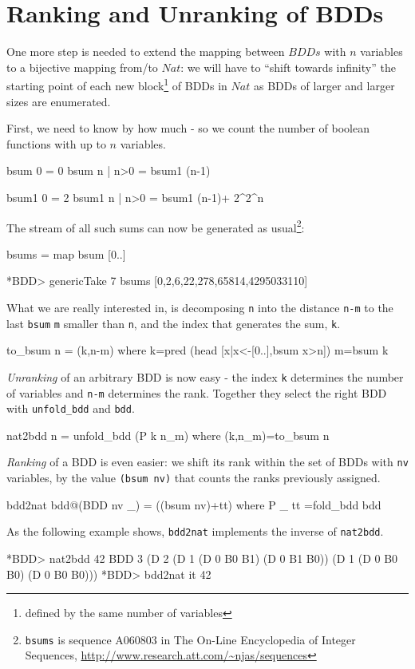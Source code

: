 \documentclass[]{INCLUDES/llncs}
\begin{document}
\section{Ranking and Unranking of BDDs} \label{rank}

One more step is needed to extend the mapping between $BDDs$ with $n$
variables to a bijective mapping from/to $Nat$: 
we will have to ``shift towards infinity'' 
the starting point of each new block\footnote{defined by the same number of
variables} of BDDs in $Nat$ as BDDs of larger and larger sizes are enumerated.

First, we need to know by how much - so we count the number
of boolean functions with up to $n$ variables.
\begin{code}
bsum 0 = 0
bsum n | n>0 = bsum1 (n-1)

bsum1 0 = 2
bsum1 n | n>0 = bsum1 (n-1)+ 2^2^n
\end{code}
The stream of all such sums can now be generated as usual\footnote{{\tt bsums}
is sequence A060803 in The On-Line Encyclopedia of Integer
Sequences, \url{http://www.research.att.com/~njas/sequences}}:
\begin{code}
bsums = map bsum [0..]
\end{code}
\begin{codex}
*BDD> genericTake 7 bsums
  [0,2,6,22,278,65814,4295033110]
\end{codex}

What we are really interested in, is decomposing {\tt n} into
the distance {\tt n-m} to the
last {\tt bsum} {\tt m} smaller than {\tt n},
and the index that generates the sum, {\tt k}.
\begin{code}
to_bsum n = (k,n-m) where 
  k=pred (head [x|x<-[0..],bsum x>n])
  m=bsum k
\end{code}
{\em Unranking} of an arbitrary BDD is now easy - the index {\tt k}
determines the number of variables and {\tt n-m} determines
the rank. Together they select the right BDD
with {\tt unfold\_bdd} and {\tt bdd}.
\begin{code}
nat2bdd n = unfold_bdd (P k n_m)
  where (k,n_m)=to_bsum n
\end{code}
{\em Ranking} of a BDD is even easier: we shift its rank
within the set of BDDs with {\tt nv} 
variables, by the value {\tt (bsum nv)} that
counts the ranks previously assigned.
\begin{code}
bdd2nat bdd@(BDD nv _) =  ((bsum nv)+tt) where
  P _ tt =fold_bdd bdd
\end{code}
As the following example shows,
{\tt bdd2nat}
implements the inverse of
{\tt nat2bdd}.
\begin{codex}
*BDD> nat2bdd 42
BDD 3 (D 2 (D 1 (D 0 B0 B1) (D 0 B1 B0)) 
           (D 1 (D 0 B0 B0) (D 0 B0 B0)))
*BDD> bdd2nat it
42
\end{codex}
\end{document}
